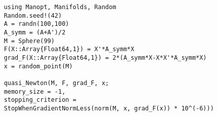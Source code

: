 \begin{lstlisting}
    using Manopt, Manifolds, Random
    Random.seed!(42)
    A = randn(100,100)
    A_symm = (A+A')/2
    M = Sphere(99)
    F(X::Array{Float64,1}) = X'*A_symm*X
    grad_F(X::Array{Float64,1}) = 2*(A_symm*X-X*X'*A_symm*X)
    x = random_point(M)
        
    quasi_Newton(M, F, grad_F, x;
    memory_size = -1,
    stopping_criterion =
    StopWhenGradientNormLess(norm(M, x, grad_F(x)) * 10^(-6)))
\end{lstlisting}